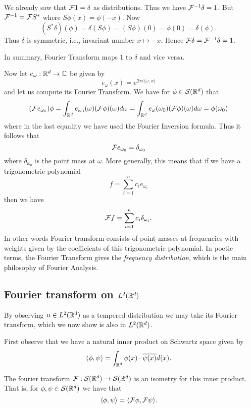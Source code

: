 \documentclass[twoside, a4paper, 10pt]{amsart}
\begin{document}
\begin{eg} We already saw that $\mathcal{F} 1 = \delta$ as distributions. Thus we have $\mathcal{F}^{-1}\delta = 1$. But $\mathcal{F}^{-1} = \mathcal{F} S^*$ where $S\phi(x) = \phi(-x)$. Now $$(S^* \delta)(\phi) = \delta(S \phi) = (S\phi)(0) = \phi(0) = \delta(\phi).$$ Thus $\delta$ is symmetric, i.e., invariant number $x \mapsto -x$. Hence $\mathcal{F} \delta = \mathcal{F}^{-1} \delta = 1$.

In summary, Fourier Transform maps $1$ to $\delta$ and vice versa.

Now let $e_{\omega}:\mathbb{R}^d \to \mathbb{C}$ be given by $$e_{\omega}(x) = e^{2\pi i \langle \omega, x \rangle}$$ and let us compute its Fourier Transform. We have for $\phi \in \mathcal{S}(\mathbb{R}^d)$ that $$(\mathcal{F} e_{\omega_0}) \phi = \int_{\mathbb{R}^d} e_{\omega_0}(\omega) (\mathcal{F} \phi)(\omega) d\omega =  \int_{\mathbb{R}^d} e_{\omega}(\omega_0) (\mathcal{F} \phi)(\omega) d\omega = \phi(\omega_0) $$ where in the last equality we have used the Fourier Inversion formula. Thus it follows that $$\mathcal{F} e_{\omega_0} = \delta_{\omega_0}$$ where $\delta_{\omega_0}$ is the point mass at $\omega$. More generally, this means that if we have a trigonometric polynomial $$f = \sum_{i=1}^n c_i e_{\omega_i}$$ then we have $$\mathcal{F} f = \sum_{i=1}^n c_i \delta_{\omega_i}.$$ In other words Fourier transform consists of point masses at frequencies with weights given by the coefficients of this trigonometric polynomial. In poetic terms, the Fourier Transform gives the \textit{frequency distribution}, which is the main philosophy of Fourier Analysis.

\end{eg}

\subsection{Fourier transform on $L^2(\mathbb{R}^d)$}

By observing $u \in L^2(\mathbb{R}^d)$ as a tempered distribution we may take its Fourier transform, which we now show is also in $L^2(\mathbb{R}^d)$.

First observe that we have a natural inner product on Schwartz space given by $$\langle \phi, \psi \rangle = \int_{\mathbb{R}^d} \phi(x) \cdot \overline{\psi(x)} d(x).$$

\begin{thm} The fourier transform $\mathcal{F}:\mathcal{S}(\mathbb{R}^d) \to \mathcal{S}(\mathbb{R}^d)$ is an isometry for this inner product. That is, for $\phi, \psi \in \mathcal{S}(\mathbb{R}^d)$ we have that $$\langle \phi, \psi \rangle = \langle \mathcal{F} \phi,\mathcal{F} \psi \rangle.$$ 

\end{thm}
\end{document}
